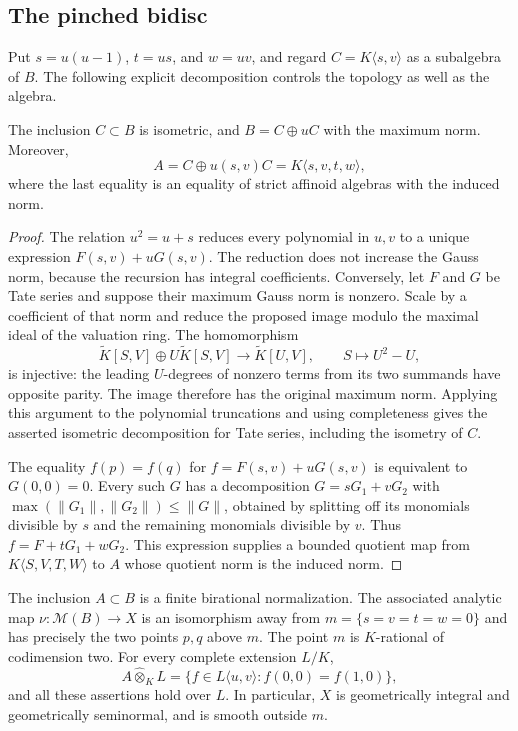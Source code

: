 \subsection{The pinched bidisc}\label{sec:supplied-p031-pinched-bidisc}

Put $s=u(u-1)$, $t=us$, and $w=uv$, and regard $C=K\langle s,v\rangle$ as a subalgebra of $B$. The following explicit decomposition controls the topology as well as the algebra.

\begin{lemma}\label{lem:supplied-p031-banach-decomposition}
The inclusion $C\subset B$ is isometric, and $B=C\oplus uC$ with the maximum norm. Moreover,
\[
 A=C\oplus u(s,v)C=K\langle s,v,t,w\rangle,
\]
where the last equality is an equality of strict affinoid algebras with the induced norm.
\end{lemma}

\begin{proof}
The relation $u^2=u+s$ reduces every polynomial in $u,v$ to a unique expression $F(s,v)+uG(s,v)$. The reduction does not increase the Gauss norm, because the recursion has integral coefficients. Conversely, let $F$ and $G$ be Tate series and suppose their maximum Gauss norm is nonzero. Scale by a coefficient of that norm and reduce the proposed image modulo the maximal ideal of the valuation ring. The homomorphism
\[
 \widetilde K[S,V]\oplus U\widetilde K[S,V]\longrightarrow\widetilde K[U,V],\qquad S\longmapsto U^2-U,
\]
is injective: the leading $U$-degrees of nonzero terms from its two summands have opposite parity. The image therefore has the original maximum norm. Applying this argument to the polynomial truncations and using completeness gives the asserted isometric decomposition for Tate series, including the isometry of $C$.

The equality $f(p)=f(q)$ for $f=F(s,v)+uG(s,v)$ is equivalent to $G(0,0)=0$. Every such $G$ has a decomposition $G=sG_1+vG_2$ with $\max(\|G_1\|,\|G_2\|)\leq\|G\|$, obtained by splitting off its monomials divisible by $s$ and the remaining monomials divisible by $v$. Thus $f=F+tG_1+wG_2$. This expression supplies a bounded quotient map from $K\langle S,V,T,W\rangle$ to $A$ whose quotient norm is the induced norm.
\end{proof}

\begin{proposition}\label{prop:supplied-p031-normalization-base-change}
The inclusion $A\subset B$ is a finite birational normalization. The associated analytic map $\nu:\mathcal M(B)\to X$ is an isomorphism away from $m=\{s=v=t=w=0\}$ and has precisely the two points $p,q$ above $m$. The point $m$ is $K$-rational of codimension two. For every complete extension $L/K$,
\[
 A\widehat\otimes_K L=\{f\in L\langle u,v\rangle:f(0,0)=f(1,0)\},
\]
and all these assertions hold over $L$. In particular, $X$ is geometrically integral and geometrically seminormal, and is smooth outside $m$.
\end{proposition}

